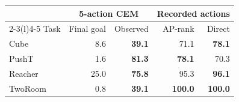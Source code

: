 \begingroup
\normalsize
\setlength{\tabcolsep}{7pt}
\begin{tabular}{lrrrr}
\toprule
 & \multicolumn{2}{c}{5-action CEM} & \multicolumn{2}{c}{Recorded actions} \\
\cmidrule(lr){2-3}\cmidrule(l){4-5}
Task & Final goal & Observed & AP-rank & Direct \\
\midrule
Cube & 8.6 & \textbf{39.1} & 71.1 & \textbf{78.1} \\
PushT & 1.6 & \textbf{81.3} & \textbf{78.1} & 70.3 \\
Reacher & 25.0 & \textbf{75.8} & 95.3 & \textbf{96.1} \\
TwoRoom & 0.8 & \textbf{39.1} & \textbf{100.0} & \textbf{100.0} \\
\bottomrule
\end{tabular}
\endgroup
